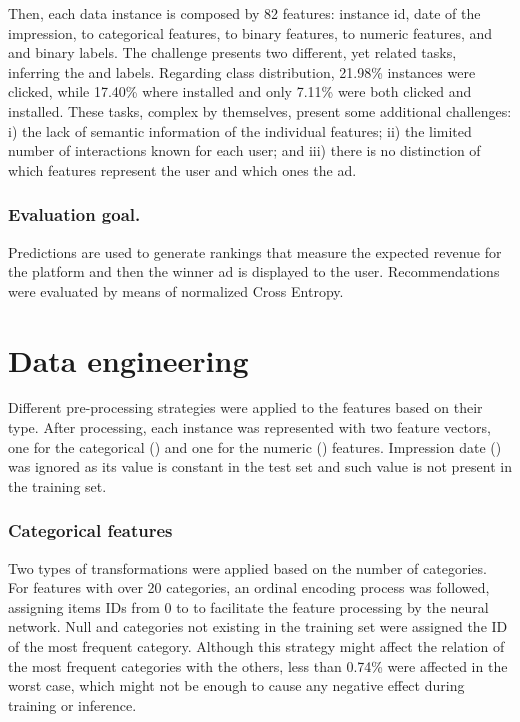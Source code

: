 \documentclass[manuscript,nonacm]{acmart}
\begin{document}
\smallskip
Then, each data instance is composed by 82 features:  instance id,  date of the impression,  to  categorical features,  to  binary features,  to  numeric features, and  and  binary labels. The challenge presents two different, yet related tasks, inferring the  and  labels. Regarding class distribution, 21.98\% instances were clicked, while 17.40\% where installed and only 7.11\% were both clicked and installed.
These tasks, complex by themselves, present some additional challenges: i) the lack of semantic information of the individual features; ii) the limited number of interactions known for each user; 
and iii) there is no distinction of which features represent the user and which ones the ad. 

\subsubsection*{\textbf{Evaluation goal.}}\hfill

Predictions are used to generate rankings that measure the expected revenue for the platform and then the winner ad is displayed to the user. Recommendations were evaluated by means of normalized Cross Entropy.

\section{Data engineering}\label{sec:data-eng}
Different pre-processing strategies were applied to the features based on their type. After processing, each instance was represented with two feature vectors, one for the categorical () and one for the numeric () features. Impression date () was ignored as its value is constant in the test set and such value is not present in the training set.

\subsubsection*{\textbf{Categorical features}}\hfill 

Two types of transformations were applied based on the number of categories. For features with over 20 categories, an ordinal encoding process was followed, assigning items IDs from 0 to  to facilitate the feature processing by the neural network. Null and categories not existing in the training set were assigned 
the ID of the most frequent category. Although this strategy might affect the relation of the most frequent categories with the others, less than 0.74\% were affected in the worst case, which might not be enough to cause any negative effect during training or inference.
\end{document}
